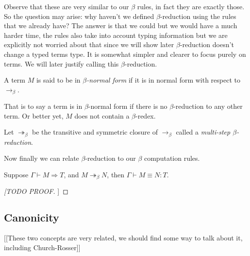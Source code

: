 \begin{remark}
    Observe that these are very similar to our $\beta$ rules, in fact they are exactly those. So the question may arise: why haven't we defined $\beta$-reduction using the rules that we already have? The answer is that we could but we would have a much harder time, the rules also take into account typing information but we are explicitly not worried about that since we will show later $\beta$-reduction doesn't change a typed terms type. It is somewhat simpler and clearer to focus purely on terms. We will later justify calling this $\beta$-reduction.
\end{remark}

\begin{defin}
    A term $M$ is said to be in \emph{$\beta$-normal form} if it is in normal form with respect to $\to_\beta$.
\end{defin}

\begin{remark}
    That is to say a term is in $\beta$-normal form if there is no $\beta$-reduction to any other term. Or better yet, $M$ does not contain a $\beta$-redex.
\end{remark}

\begin{defin}
    Let $\twoheadrightarrow_{\beta}$ be the transitive and symmetric closure of $\to_{\beta}$ called a \emph{multi-step $\beta$-reduction}.
\end{defin}

Now finally we can relate $\beta$-reduction to our $\beta$ computation rules.

\begin{lemma}
    Suppose $\Gamma \vdash M \Rightarrow T$, and $M \twoheadrightarrow_{\beta} N$, then $\Gamma \vdash M \equiv N : T$.
\end{lemma}

\begin{proof}
[[TODO PROOF]]
\end{proof}




\subsection{Canonicity}



[[These two concepts are very related, we should find some way to talk about it, including Church-Rosser]]
